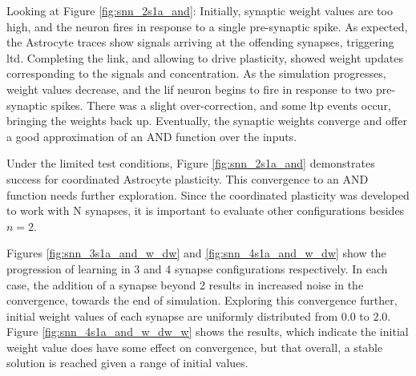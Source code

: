 

Looking at Figure \ref{fig:snn_2s1a_and}: Initially, synaptic weight values are
too high, and the neuron fires in response to a single pre-synaptic spike. As
expected, the Astrocyte traces show \dser signals arriving at the offending
synapses, triggering \Gls{ltd}. Completing the link, and allowing \ca to drive
plasticity, showed weight updates corresponding to the \dser signals and \ca
concentration. As the simulation progresses, weight values decrease, and the \Gls{lif}
neuron begins to fire in response to two pre-synaptic spikes. There was a slight
over-correction, and some \Gls{ltp} events occur, bringing the weights back
up. Eventually, the synaptic weights converge and offer a good approximation of
an AND function over the inputs.

Under the limited test conditions, Figure \ref{fig:snn_2s1a_and} demonstrates
success for coordinated Astrocyte plasticity. This convergence to an AND
function needs further exploration. Since the coordinated plasticity was
developed to work with N synapses, it is important to evaluate other
configurations besides $n=2$.



Figures \ref{fig:snn_3s1a_and_w_dw} and \ref{fig:snn_4s1a_and_w_dw} show the
progression of learning in 3 and 4 synapse configurations respectively. In each
case, the addition of a synapse beyond 2 results in increased noise in the
convergence, towards the end of simulation. Exploring this convergence further,
initial weight values of each synapse are uniformly distributed from $0.0$ to
$2.0$. Figure \ref{fig:snn_4s1a_and_w_dw_w} shows the results, which indicate
the initial weight value does have some effect on convergence, but that overall,
a stable solution is reached given a range of initial values.

